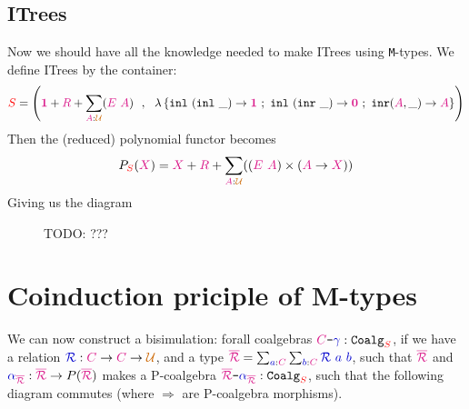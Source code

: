 \documentclass[twoside,11pt,openright]{report}
\newcommand*{\term}[1]{\textcolor{blue!80!black}{#1}}
\newcommand*{\type}[1]{\textcolor{magenta!90!black}{#1}}
\newcommand*{\container}[1]{\textcolor{red}{#1}}
\newcommand*{\universe}[1]{\textcolor{orange!80!black}{#1}}
\newcommand*{\unit}{\type{\textbf{1}}}
\newcommand*{\empt}{\type{\textbf{0}}}
\newcommand*{\coalg}[2]{#1\texttt{-}#2}
\begin{document}
\subsection{ITrees}
Now we should have all the knowledge needed to make ITrees using \texttt{M}-types. We define ITrees by the container:
\begin{equation}
  \container{S} = \left( \unit+\type{R}+\sum_{\type{A}:\universe{\mathcal{U}}} (\type{E}~\type{A}) ~~,~~ \lambda\left\{ \texttt{inl}~(\texttt{inl}~\_) \rightarrow \unit ~;~ \texttt{inl}~(\texttt{inr}~\_) \rightarrow \empt ~;~ \texttt{inr} (\type{A},\_)  \rightarrow \type{A} \right\} \right)
\end{equation}
Then the (reduced) polynomial functor becomes
\begin{equation}
  P_{\container{S}}(\type{X}) = \type{X} + \type{R} + \sum_{\type{A} : \universe{\mathcal{U}}} ((\type{E}~\type{A}) \times (\type{A} \rightarrow \type{X}))
\end{equation}
Giving us the diagram
\begin{figure}[h]
  \centering
  \caption{TODO: ???}
\end{figure}

\section{Coinduction priciple of M-types}
We can now construct a bisimulation: forall coalgebras \(\coalg{\type{C}}{\term{\gamma}} : \mathtt{Coalg}_{\container{S}}\), if we have a relation \(\term{\mathcal{R}} : \type{C} \rightarrow \type{C} \rightarrow \universe{\mathcal{U}}\), and a type \(\type{\overline{\mathcal{R}}} = \sum_{\term{a} : \type{C}} \sum_{\term{b} : \type{C}} \term{\mathcal{R}}~\term{a}~\term{b}\), such that \(\type{\overline{\mathcal{R}}}\) and \(\term{\alpha}_{\type{\overline{\mathcal{R}}}} : \type{\overline{\mathcal{R}}} \rightarrow P(\type{\overline{\mathcal{R}}})\) makes a P-coalgebra \(\coalg{\type{\overline{\mathcal{R}}}}{\term{\alpha}_{\type{\overline{\mathcal{R}}}}} : \mathtt{Coalg}_{\container{S}}\), such that the following diagram commutes (where \(\Rightarrow\) are P-coalgebra morphisms).
\end{document}
